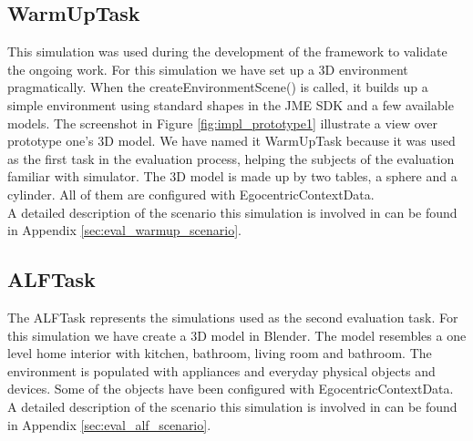 \subsection{WarmUpTask} %
\label{subsec:impl_warmup_task}
This simulation was used during the development of the framework to validate the ongoing work. For this simulation we have set up a 3D environment pragmatically. When the createEnvironmentScene() is called, it builds up a simple environment using standard shapes in the JME SDK and a few available models. The screenshot in Figure \ref{fig:impl_prototype1} illustrate a view over prototype one's 3D model. We have named it WarmUpTask because it was used as the first task in the evaluation process, helping the subjects of the evaluation familiar with simulator. The 3D model is made up by two tables, a sphere and a cylinder. All of them are configured with EgocentricContextData.\\

A detailed description of the scenario this simulation is involved in can be found in Appendix \ref{sec:eval_warmup_scenario}.

\subsection{ALFTask} %
\label{subsec:impl_alf_task}
The ALFTask represents the simulations used as the second evaluation task. For this simulation we have create a 3D model in Blender. The model resembles a one level home interior with kitchen, bathroom, living room and bathroom. The environment is populated with appliances and everyday physical objects and devices. Some of the objects have been configured with EgocentricContextData. A detailed description of the scenario this simulation is involved in can be found in Appendix \ref{sec:eval_alf_scenario}.\\

